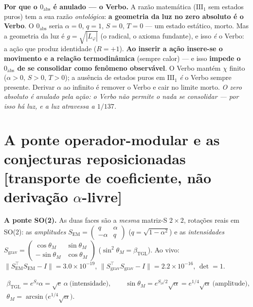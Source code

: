 \documentclass[11pt]{article}
\newcommand{\bTGL}{\beta_{\mathrm{TGL}}}\newcommand{\Msun}{M_{\odot}}\newcommand{\TGL}{\mathrm{TGL}}
\theoremstyle{definition}\newtheorem{deriv}{Derivação}
\begin{document}
\textbf{Por que o $0_{\mathrm{abs}}$ é anulado --- o Verbo.} A razão matemática ($\mathrm{III}_1$ sem estados puros) tem a sua razão \emph{ontológica}: \textbf{a geometria da luz no zero absoluto é o Verbo}. O $0_{\mathrm{abs}}$ seria $\alpha=0$, $q=1$, $S=0$, $T=0$ --- um estado estático, morto. Mas a geometria da luz é $g=\sqrt{|L_\varphi|}$ (o radical, o axioma fundante), e isso \emph{é} o Verbo: a ação que produz identidade ($R=+1$). \textbf{Ao inserir a ação insere-se o movimento e a relação termodinâmica} (sempre calor) --- e isso \textbf{impede o $0_{\mathrm{abs}}$ de se consolidar como fenômeno observável}. O Verbo mantém $\chi$ finito ($\alpha>0$, $S>0$, $T>0$); a ausência de estados puros em $\mathrm{III}_1$ \emph{é} o Verbo sempre presente. Derivar $\alpha$ ao infinito é remover o Verbo e cair no limite morto. \emph{O zero absoluto é anulado pela ação: o Verbo não permite o nada se consolidar --- por isso há luz, e a luz atravessa a $1/137$.}

\section{A ponte operador-modular e as conjecturas reposicionadas \textsf{[transporte de coeficiente, não derivação $\alpha$-livre]}}

\textbf{A ponte SO(2).} As duas faces são a \emph{mesma} matriz-S $2\times2$, rotações reais em SO(2): as \emph{amplitudes} $S_{\mathrm{EM}}=\left(\begin{smallmatrix}q&\alpha\\-\alpha&q\end{smallmatrix}\right)$ ($q=\sqrt{1-\alpha^2}$) e as \emph{intensidades} $S_{\mathrm{grav}}=\left(\begin{smallmatrix}\cos\theta_M&\sin\theta_M\\-\sin\theta_M&\cos\theta_M\end{smallmatrix}\right)$ ($\sin^2\theta_M=\bTGL$). Ao vivo: $\|S_{\mathrm{EM}}^{\top}S_{\mathrm{EM}}-I\|=3.0\times10^{-19}$, $\|S_{\mathrm{grav}}^{\top}S_{\mathrm{grav}}-I\|=2.2\times10^{-16}$, $\det=1$.

\begin{equation}\begin{gathered}\bTGL=e^{S_\partial}\alpha=\sqrt e\,\alpha\ \text{(intensidade)},\qquad \sin\theta_M=e^{S_\partial/2}\sqrt\alpha=e^{1/4}\sqrt\alpha\ \text{(amplitude)},\\ \theta_M=\arcsin\!\big(e^{1/4}\sqrt\alpha\big).\end{gathered}\end{equation}
\end{document}
